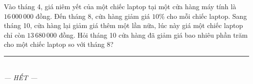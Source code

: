 \documentclass[12pt,a4paper]{article}
\begin{document}
\begin{ex}
Vào tháng 4, giá niêm yết của một chiếc laptop tại một cửa hàng máy tính là $16\,000\,000$ đồng. Đến tháng 8, cửa hàng giảm giá $10\%$ cho mỗi chiếc laptop. Sang tháng 10, cửa hàng lại giảm giá thêm một lần nữa, lúc này giá một chiếc laptop chỉ còn $13\,680\,000$ đồng. Hỏi tháng 10 cửa hàng đã giảm giá bao nhiêu phần trăm cho một chiếc laptop so với tháng 8?
\end{ex}
\vspace{2mm}


\begin{center}
\rule{4cm}{0.4pt}\\
\textit{--- HẾT ---}
\end{center}
\end{document}
